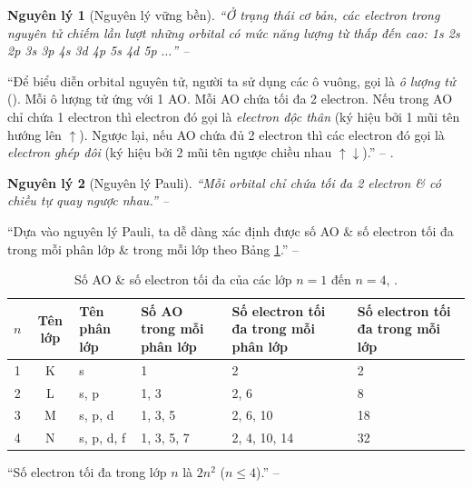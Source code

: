 \documentclass[oneside]{book}
\numberwithin{equation}{section}
\newtheorem{nguyenly}{Nguyên lý}[section]
\begin{document}
\begin{nguyenly}[Nguyên lý vững bền]
	``Ở trạng thái cơ bản, các electron trong nguyên tử chiếm lần lượt những orbital có mức năng lượng từ thấp đến cao: 1s 2s 2p 3s 3p 4s 3d 4p 5s 4d 5p $\ldots$'' -- \cite[p. 30]{SGK_Hoa_Hoc_10_Chan_Troi_Sang_Tao}
\end{nguyenly}
``Để biểu diễn orbital nguyên tử, người ta sử dụng các ô vuông, gọi là \textit{ô lượng tử} (\cite[Hình 4.8: \textsf{(a) Chiều chuyển động tự quay của electron quanh trục của nó; (b) Cách biểu diễn 2 electron trong 1 orbital}, p. 30]{SGK_Hoa_Hoc_10_Chan_Troi_Sang_Tao}). Mỗi ô lượng tử ứng với 1 AO. Mỗi AO chứa tối đa 2 electron. Nếu trong AO chỉ chứa 1 electron thì electron đó gọi là \textit{electron độc thân} (ký hiệu bởi 1 mũi tên hướng lên $\uparrow$). Ngược lại, nếu AO chứa đủ 2 electron thì các electron đó gọi là \textit{electron ghép đôi} (ký hiệu bởi 2 mũi tên ngược chiều nhau $\uparrow\downarrow$).'' -- \cite[p. 30]{SGK_Hoa_Hoc_10_Chan_Troi_Sang_Tao}. \cite[Hình 4.9: \textsf{(a) Electron ghép đôi \& electron độc thân; (b) Sự sắp xếp electron trên các orbital của nguyên tử oxygen.}, p. 30]{SGK_Hoa_Hoc_10_Chan_Troi_Sang_Tao}

\begin{nguyenly}[Nguyên lý Pauli]
	``Mỗi orbital chỉ chứa tối đa 2 electron \& có chiều tự quay ngược nhau.'' -- \cite[p. 30]{SGK_Hoa_Hoc_10_Chan_Troi_Sang_Tao}
\end{nguyenly}
``Dựa vào nguyên lý Pauli, ta dễ dàng xác định được số AO \& số electron tối đa trong mỗi phân lớp \& trong mỗi lớp theo Bảng \ref{tab:so AO & so electron toi da cua cac lop n = 1 den n = 4}.'' -- \cite[p. 30]{SGK_Hoa_Hoc_10_Chan_Troi_Sang_Tao}

\begin{table}[H]
	\centering
	\begin{tabular}{|c|c|l|l|p{4cm}|p{3.5cm}|}
		\hline
		$n$ & \textbf{Tên lớp} & \textbf{Tên phân lớp} & \textbf{Số AO trong mỗi phân lớp} & \textbf{Số electron tối đa trong mỗi phân lớp} & \textbf{Số electron tối đa trong mỗi lớp} \\
		\hline
		1 & K & s & 1 & 2 & 2 \\
		\hline
		2 & L & s, p & 1, 3 & 2, 6 & 8 \\
		\hline
		3 & M & s, p, d & 1, 3, 5 & 2, 6, 10 & 18 \\
		\hline
		4 & N & s, p, d, f & 1, 3, 5, 7 & 2, 4, 10, 14 & 32 \\
		\hline
	\end{tabular}
	\caption{Số AO \& số electron tối đa của các lớp $n = 1$ đến $n = 4$, \cite[Bảng 4.1, p. 31]{SGK_Hoa_Hoc_10_Chan_Troi_Sang_Tao}.}
	\label{tab:so AO & so electron toi da cua cac lop n = 1 den n = 4}
\end{table}
``Số electron tối đa trong lớp $n$ là $2n^2$ ($n\le 4$).'' -- \cite[p. 31]{SGK_Hoa_Hoc_10_Chan_Troi_Sang_Tao}
\end{document}
